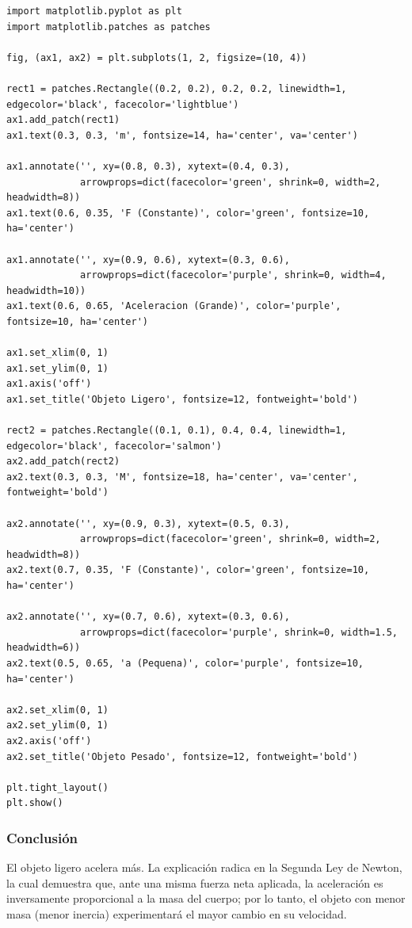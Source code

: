 \documentclass[12pt]{article}
\begin{document}
\begin{lstlisting}
import matplotlib.pyplot as plt
import matplotlib.patches as patches

fig, (ax1, ax2) = plt.subplots(1, 2, figsize=(10, 4))

rect1 = patches.Rectangle((0.2, 0.2), 0.2, 0.2, linewidth=1, edgecolor='black', facecolor='lightblue')
ax1.add_patch(rect1)
ax1.text(0.3, 0.3, 'm', fontsize=14, ha='center', va='center')

ax1.annotate('', xy=(0.8, 0.3), xytext=(0.4, 0.3), 
             arrowprops=dict(facecolor='green', shrink=0, width=2, headwidth=8))
ax1.text(0.6, 0.35, 'F (Constante)', color='green', fontsize=10, ha='center')

ax1.annotate('', xy=(0.9, 0.6), xytext=(0.3, 0.6), 
             arrowprops=dict(facecolor='purple', shrink=0, width=4, headwidth=10))
ax1.text(0.6, 0.65, 'Aceleracion (Grande)', color='purple', fontsize=10, ha='center')

ax1.set_xlim(0, 1)
ax1.set_ylim(0, 1)
ax1.axis('off')
ax1.set_title('Objeto Ligero', fontsize=12, fontweight='bold')

rect2 = patches.Rectangle((0.1, 0.1), 0.4, 0.4, linewidth=1, edgecolor='black', facecolor='salmon')
ax2.add_patch(rect2)
ax2.text(0.3, 0.3, 'M', fontsize=18, ha='center', va='center', fontweight='bold')

ax2.annotate('', xy=(0.9, 0.3), xytext=(0.5, 0.3), 
             arrowprops=dict(facecolor='green', shrink=0, width=2, headwidth=8))
ax2.text(0.7, 0.35, 'F (Constante)', color='green', fontsize=10, ha='center')

ax2.annotate('', xy=(0.7, 0.6), xytext=(0.3, 0.6), 
             arrowprops=dict(facecolor='purple', shrink=0, width=1.5, headwidth=6))
ax2.text(0.5, 0.65, 'a (Pequena)', color='purple', fontsize=10, ha='center')

ax2.set_xlim(0, 1)
ax2.set_ylim(0, 1)
ax2.axis('off')
ax2.set_title('Objeto Pesado', fontsize=12, fontweight='bold')

plt.tight_layout()
plt.show()
\end{lstlisting}

\subsubsection*{Conclusión}
El objeto ligero acelera más. La explicación radica en la Segunda Ley de Newton, la cual demuestra que, ante una misma fuerza neta aplicada, la aceleración es inversamente proporcional a la masa del cuerpo; por lo tanto, el objeto con menor masa (menor inercia) experimentará el mayor cambio en su velocidad.
\end{document}

